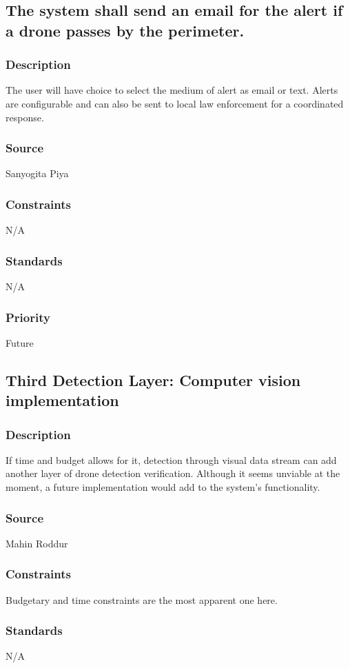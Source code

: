 \subsection{The system shall send an email for the alert if a drone passes by the perimeter.}
\subsubsection{Description}
The user will have choice to select the medium of alert as email or text. Alerts are configurable and can also be sent to local law enforcement for a coordinated response.
\subsubsection{Source}
Sanyogita Piya
\subsubsection{Constraints}
N/A
\subsubsection{Standards}
N/A
\subsubsection{Priority}
Future

\subsection{Third Detection Layer: Computer vision implementation}
\subsubsection{Description}
If time and budget allows for it, detection through visual data stream can add another layer of drone detection verification. Although it seems unviable at the moment, a future implementation would add to the system's functionality.
\subsubsection{Source}
Mahin Roddur
\subsubsection{Constraints}
Budgetary and time constraints are the most apparent one here. 
\subsubsection{Standards}
N/A

